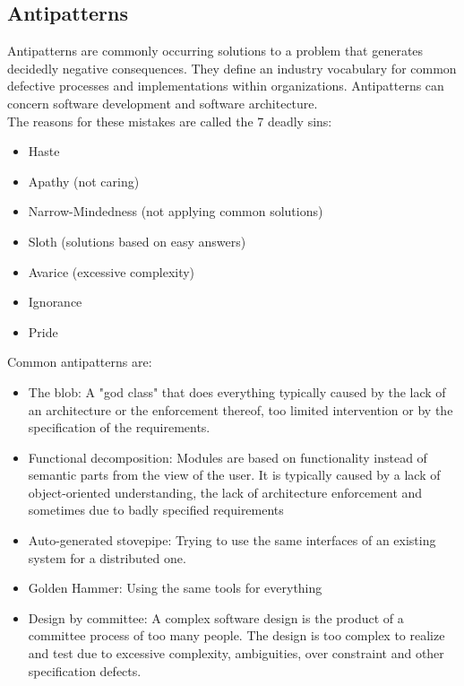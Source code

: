 \subsection{Antipatterns}
Antipatterns are commonly occurring solutions to a problem that generates decidedly negative consequences.
They define an industry vocabulary for common defective processes and implementations within organizations.
Antipatterns can concern software development and software architecture.\\
The reasons for these mistakes are called the 7 deadly sins:
\begin{itemize}
  \item Haste
  \item Apathy (not caring)
  \item Narrow-Mindedness (not applying common solutions)
  \item Sloth (solutions based on easy answers)
  \item Avarice (excessive complexity)
  \item Ignorance
  \item Pride
\end{itemize}

Common antipatterns are:
\begin{itemize}
  \item The blob: A "god class" that does everything typically caused by the lack of an architecture or the enforcement thereof, too limited intervention or by the specification of the requirements. 
  \item Functional decomposition: Modules are based on functionality instead of semantic parts from the view of the user. It is typically caused by a lack of object-oriented understanding, the lack of architecture enforcement and sometimes due to badly specified requirements
  \item Auto-generated stovepipe: Trying to use the same interfaces of an existing system for a distributed one.
  \item Golden Hammer: Using the same tools for everything
  \item Design by committee: A complex software design is the product of a committee process of too many people. The design is too complex to realize and test due to excessive complexity, ambiguities, over constraint and other specification defects.
\end{itemize}
